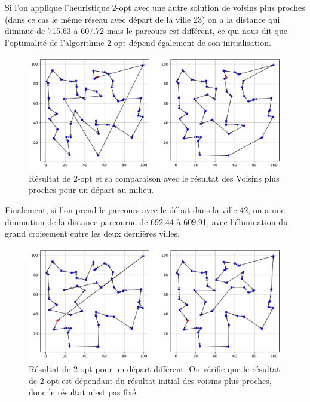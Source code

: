 \documentclass[a4paper,11pt,fleqn]{article}
\begin{document}
Si l'on applique l'heuristique 2-opt avec une autre solution de voisins plus proches (dans ce cas le même réseau avec départ de la ville 23) on a la distance qui diminue de 715.63 à 607.72 mais le parcours est différent, ce qui nous dit que l'optimalité de l'algorithme 2-opt dépend également de son initialisation.

\begin{figure}[H]
    \centering
    \includegraphics[width=\textwidth]{images/2opt_50_villes_depart_23.pdf}
    \caption{Résultat de 2-opt et sa comparaison avec le résultat des Voisins plus proches pour un départ au milieu.}
    \label{fig:2opt-dep23}
\end{figure}

Finalement, si l'on prend le parcours avec le début dans la ville 42, on a une diminution de la distance parcourue de 692.44 à 609.91, avec l'élimination du grand croisement entre les deux dernières villes.

\begin{figure}[H]
    \centering
    \includegraphics[width=\textwidth]{images/2opt_50_villes_depart_42.pdf}
    \caption{Résultat de 2-opt pour un départ différent. On vérifie que le résultat de 2-opt est dépendant du résultat initial des voisins plus proches, donc le résultat n'est pas fixé.}
    \label{fig:2opt-dep42}
\end{figure}
\end{document}
